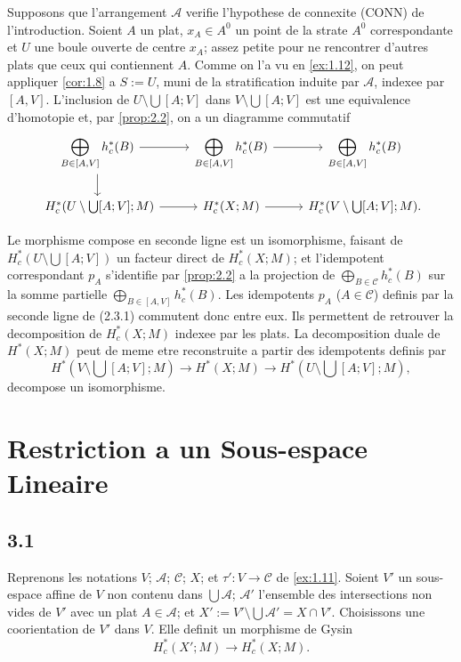 \documentclass[11pt,a4paper]{article}
\theoremstyle{plain}
\theoremstyle{definition}
\begin{document}
Supposons que l'arrangement $\mathcal{A}$ verifie l'hypothese de connexite (CONN) de l'introduction. Soient $A$ un plat, $x_A \in A^0$ un point de la strate $A^0$ correspondante et $U$ une boule ouverte de centre $x_A$; assez petite pour ne rencontrer d'autres plats que ceux qui contiennent $A$. Comme on l'a vu en \ref{ex:1.12}, on peut appliquer \ref{cor:1.8} a $S := U$, muni de la stratification induite par $\mathcal{A}$, indexee par $[A,V]$. L'inclusion de $U \setminus \bigcup[A;V]$ dans $V \setminus \bigcup[A;V]$ est une equivalence d'homotopie et, par \ref{prop:2.2}, on a un diagramme commutatif
\begin{equation}\label{eq:2.3.1}
\begin{tikzcd}
\displaystyle\bigoplus_{B \in [A,V]} h^*_c(B) \arrow[r] \arrow[d] & \displaystyle\bigoplus_{B \in [A,V]} h^*_c(B) \arrow[r] & \displaystyle\bigoplus_{B \in [A,V]} h^*_c(B) \\\
H^*_c(U \setminus \bigcup[A;V];M) \arrow[r] & H^*_c(X;M) \arrow[r] & H^*_c(V \setminus \bigcup[A;V];M).
\end{tikzcd}
\end{equation}

Le morphisme compose en seconde ligne est un isomorphisme, faisant de $H^*_c(U \setminus \bigcup[A;V])$ un facteur direct de $H^*_c(X;M)$; et l'idempotent correspondant $p_A$ s'identifie par \ref{prop:2.2} a la projection de $\bigoplus_{B \in \mathcal{C}} h^*_c(B)$ sur la somme partielle $\bigoplus_{B \in [A,V]} h^*_c(B)$. Les idempotents $p_A$ ($A \in \mathcal{C}$) definis par la seconde ligne de (2.3.1) commutent donc entre eux. Ils permettent de retrouver la decomposition de $H^*_c(X;M)$ indexee par les plats. La decomposition duale de $H^*(X;M)$ peut de meme etre reconstruite a partir des idempotents definis par
\[H^*(V \setminus \bigcup[A;V];M) \longrightarrow H^*(X;M) \longrightarrow H^*(U \setminus \bigcup[A;V];M),\]
decompose un isomorphisme.


\section{Restriction a un Sous-espace Lineaire}\label{sec:3}

\subsection{3.1}\label{subsec:3.1}

Reprenons les notations $V$; $\mathcal{A}$; $\mathcal{C}$; $X$; et $\tau': V \to \mathcal{C}$ de \ref{ex:1.11}. Soient $V'$ un sous-espace affine de $V$ non contenu dans $\bigcup\mathcal{A}$; $\mathcal{A}'$ l'ensemble des intersections non vides de $V'$ avec un plat $A \in \mathcal{A}$; et $X' := V' \setminus \bigcup\mathcal{A}' = X \cap V'$. Choisissons une coorientation de $V'$ dans $V$. Elle definit un morphisme de Gysin
\begin{equation}\label{eq:3.1.1}
H^*_c(X';M) \longrightarrow H^*_c(X;M).
\tag{3.1.1}
\end{equation}
\end{document}
